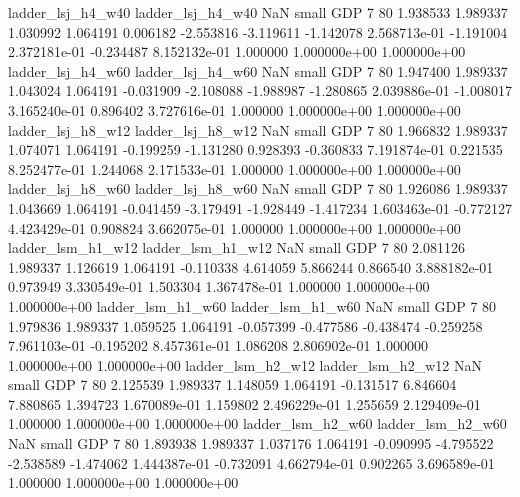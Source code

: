        ladder_lsj_h4_w40        ladder_lsj_h4_w40                   NaN      small      GDP                 7 80 1.938533       1.989337 1.030992       1.064191    0.006182     -2.553816     -3.119611    -1.142078   2.568713e-01 -1.191004 2.372181e-01    -0.234487   8.152132e-01            1.000000    1.000000e+00        1.000000e+00
       ladder_lsj_h4_w60        ladder_lsj_h4_w60                   NaN      small      GDP                 7 80 1.947400       1.989337 1.043024       1.064191   -0.031909     -2.108088     -1.988987    -1.280865   2.039886e-01 -1.008017 3.165240e-01     0.896402   3.727616e-01            1.000000    1.000000e+00        1.000000e+00
       ladder_lsj_h8_w12        ladder_lsj_h8_w12                   NaN      small      GDP                 7 80 1.966832       1.989337 1.074071       1.064191   -0.199259     -1.131280      0.928393    -0.360833   7.191874e-01  0.221535 8.252477e-01     1.244068   2.171533e-01            1.000000    1.000000e+00        1.000000e+00
       ladder_lsj_h8_w60        ladder_lsj_h8_w60                   NaN      small      GDP                 7 80 1.926086       1.989337 1.043669       1.064191   -0.041459     -3.179491     -1.928449    -1.417234   1.603463e-01 -0.772127 4.423429e-01     0.908824   3.662075e-01            1.000000    1.000000e+00        1.000000e+00
       ladder_lsm_h1_w12        ladder_lsm_h1_w12                   NaN      small      GDP                 7 80 2.081126       1.989337 1.126619       1.064191   -0.110338      4.614059      5.866244     0.866540   3.888182e-01  0.973949 3.330549e-01     1.503304   1.367478e-01            1.000000    1.000000e+00        1.000000e+00
       ladder_lsm_h1_w60        ladder_lsm_h1_w60                   NaN      small      GDP                 7 80 1.979836       1.989337 1.059525       1.064191   -0.057399     -0.477586     -0.438474    -0.259258   7.961103e-01 -0.195202 8.457361e-01     1.086208   2.806902e-01            1.000000    1.000000e+00        1.000000e+00
       ladder_lsm_h2_w12        ladder_lsm_h2_w12                   NaN      small      GDP                 7 80 2.125539       1.989337 1.148059       1.064191   -0.131517      6.846604      7.880865     1.394723   1.670089e-01  1.159802 2.496229e-01     1.255659   2.129409e-01            1.000000    1.000000e+00        1.000000e+00
       ladder_lsm_h2_w60        ladder_lsm_h2_w60                   NaN      small      GDP                 7 80 1.893938       1.989337 1.037176       1.064191   -0.090995     -4.795522     -2.538589    -1.474062   1.444387e-01 -0.732091 4.662794e-01     0.902265   3.696589e-01            1.000000    1.000000e+00        1.000000e+00
